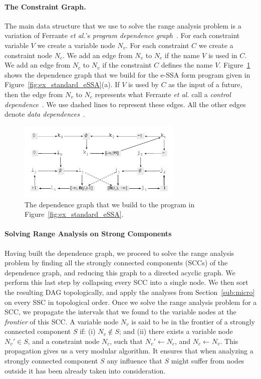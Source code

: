 \documentclass{llncs}
\begin{document}
\paragraph{The Constraint Graph.}
The main data structure that we use to solve the range analysis problem is
a variation of Ferrante {\em et al.}'s {\em program dependence
graph}~\cite{Ferrante87}.
For each constraint variable $V$ we create a variable node $N_v$.
For each constraint $C$ we create a constraint node $N_c$.
We add an edge from $N_v$ to $N_c$ if the name $V$ is used in $C$.
We add an edge from $N_c$ to $N_v$ if the constraint $C$ defines the name
$V$.
Figure~\ref{fig:ex_graph} shows the dependence graph that we build for the
e-SSA form program given in Figure~\ref{fig:ex_standard_eSSA}(a).
If $V$ is used by $C$ as the input of a future, then the edge from
$N_v$ to $N_c$ represents what Ferrante {\em et al.} call a {\em control
dependence}~\cite[p.323]{Ferrante87}.
We use dashed lines to represent these edges.
All the other edges denote {\em data dependences}~\cite[p.322]{Ferrante87}.

\begin{figure}[t!]
\begin{center}
\includegraphics[width=0.7\textwidth]{images/ex_graph}
\end{center}
\caption{\label{fig:ex_graph}
The dependence graph that we build to the program in
Figure~\ref{fig:ex_standard_eSSA}.}
\end{figure}

\paragraph{Solving Range Analysis on Strong Components}
Having built the dependence graph, we proceed to solve the range analysis
problem by finding all the strongly connected components (SCCs) of the
dependence graph, and reducing this graph to a directed acyclic graph.
We perform this last step by collapsing every SCC into a single node.
We then sort the resulting DAG topologically, and apply the analyses from
Section~\ref{sub:micro} on every SSC in topological order.
Once we solve the range analysis problem for a SCC, we propagate the
intervals that we found to the variable nodes at the {\em frontier} of this
SCC.
A variable node $N_v$ is said to be in the frontier of a strongly connected
component $S$ if:
(i) $N_v \notin S$; and
(ii) there exists a variable node $N_v' \in S$, and a constraint node $N_c$,
such that $N_v' \leftarrow N_c$, and $N_c \leftarrow N_v$.
This propagation gives us a very modular algorithm.
It ensures that when analyzing a strongly connected component $S$ any influence
that $S$ might suffer from nodes outside it has been already
taken into consideration.
\end{document}

